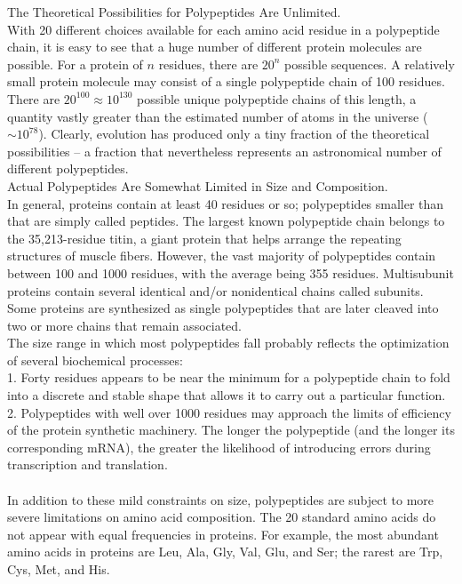 The Theoretical Possibilities for Polypeptides Are Unlimited.\\
With 20 different choices available for each amino acid residue in a polypeptide chain, it is easy to see that a huge number of different protein molecules are possible. For a protein of $n$ residues, there are $20^n$ possible sequences. A relatively small protein molecule may consist of a single polypeptide chain of 100 residues. There are $20^{100} \approx 10^{130}$ possible unique polypeptide chains of this length, a quantity vastly greater than the estimated number of atoms in the universe ($\sim 10^{78}$). Clearly, evolution has produced only a tiny fraction of the theoretical possibilities -- a fraction that nevertheless represents an astronomical number of different polypeptides.\\
Actual Polypeptides Are Somewhat Limited in Size and Composition.\\
In general, proteins contain at least 40 residues or so; polypeptides smaller than that are simply called peptides. The largest known polypeptide chain belongs to the 35,213-residue titin, a giant protein that helps arrange the repeating structures of muscle fibers. However, the vast majority of polypeptides contain between 100 and 1000 residues, with the average being 355 residues. Multisubunit proteins contain several identical and/or nonidentical chains called subunits. Some proteins are synthesized as single polypeptides that are later cleaved into two or more chains that remain associated.\\
The size range in which most polypeptides fall probably reflects the optimization of several biochemical processes:\\
1. Forty residues appears to be near the minimum for a polypeptide chain to fold into a discrete and stable shape that allows it to carry out a particular function.\\
2. Polypeptides with well over 1000 residues may approach the limits of efficiency of the protein synthetic machinery. The longer the polypeptide (and the longer its corresponding mRNA), the greater the likelihood of introducing errors during transcription and translation.\\
\\
In addition to these mild constraints on size, polypeptides are subject to more severe limitations on amino acid composition. The 20 standard amino acids do not appear with equal frequencies in proteins. For example, the most abundant amino acids in proteins are Leu, Ala, Gly, Val, Glu, and Ser; the rarest are Trp, Cys, Met, and His. 
